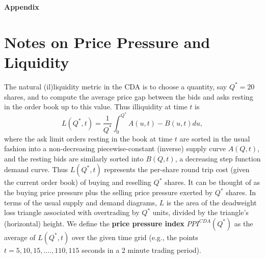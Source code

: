 \documentclass[12pt]{article}
\begin{document}
\begin{singlespace}
\appendix
\setcounter{page}{1}
\begin{center}
    \huge \textbf{Appendix}
    
\end{center}

\section{Notes on Price Pressure and Liquidity}

The natural (il)liquidity metric in the CDA is to choose a quantity, say $Q^*=20$ shares, and to compute the average price gap between the bids and asks resting in the order book up to this value.
Thus illiquidity at time $t$ is
\setcounter{equation}{0}
\begin{equation}\label{eq:Liqcda}
    L(Q^*,t) = \frac{1}{Q^*}\int_0^{Q^*} A(u,t) - B(u,t) du,
\end{equation}
where the ask limit orders resting in the book at time $t$ are sorted in the usual fashion into a non-decreasing piecewise-constant (inverse) supply curve $A(Q,t)$,
and the resting bids are similarly sorted into $B(Q,t)$, a decreasing step function demand curve.
Thus $L(Q^*,t)$ represents the per-share round trip cost (given the current order book) of buying and reselling $Q^*$ shares.
It can be thought of as the buying price pressure plus the selling price pressure exerted by $Q^*$ shares.
In terms of the usual supply and demand diagrams, $L$ is the area of the deadweight loss triangle associated with overtrading by $Q^*$ units, divided by the triangle's (horizontal) height.
We define the \textbf{price pressure index}
$PPI^{CDA}(Q^*)$ as the average of $L(Q^*,t)$ over the given time grid (e.g., the points $t=5, 10, 15, ...., 110, 115$ seconds in a 2 minute trading period).


\end{singlespace}
\end{document}
